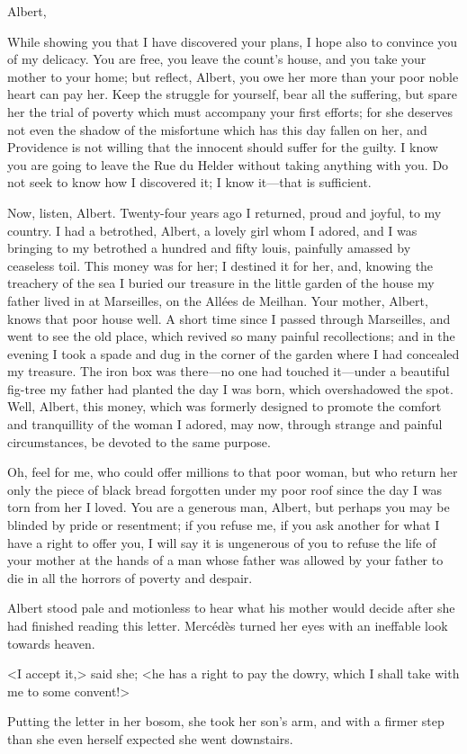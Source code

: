 \begin{mail}{}{Albert,}
	
While showing you that I have discovered your plans, I hope also to convince you of my delicacy. You are free, you leave the count's house, and you take your mother to your home; but reflect, Albert, you owe her more than your poor noble heart can pay her. Keep the struggle for yourself, bear all the suffering, but spare her the trial of poverty which must accompany your first efforts; for she deserves not even the shadow of the misfortune which has this day fallen on her, and Providence is not willing that the innocent should suffer for the guilty. I know you are going to leave the Rue du Helder without taking anything with you. Do not seek to know how I discovered it; I know it—that is sufficient. 

Now, listen, Albert. Twenty-four years ago I returned, proud and joyful, to my country. I had a betrothed, Albert, a lovely girl whom I adored, and I was bringing to my betrothed a hundred and fifty louis, painfully amassed by ceaseless toil. This money was for her; I destined it for her, and, knowing the treachery of the sea I buried our treasure in the little garden of the house my father lived in at Marseilles, on the Allées de Meilhan. Your mother, Albert, knows that poor house well. A short time since I passed through Marseilles, and went to see the old place, which revived so many painful recollections; and in the evening I took a spade and dug in the corner of the garden where I had concealed my treasure. The iron box was there—no one had touched it—under a beautiful fig-tree my father had planted the day I was born, which overshadowed the spot. Well, Albert, this money, which was formerly designed to promote the comfort and tranquillity of the woman I adored, may now, through strange and painful circumstances, be devoted to the same purpose. 

 Oh, feel for me, who could offer millions to that poor woman, but who return her only the piece of black bread forgotten under my poor roof since the day I was torn from her I loved. You are a generous man, Albert, but perhaps you may be blinded by pride or resentment; if you refuse me, if you ask another for what I have a right to offer you, I will say it is ungenerous of you to refuse the life of your mother at the hands of a man whose father was allowed by your father to die in all the horrors of poverty and despair.
 \end{mail}

 Albert stood pale and motionless to hear what his mother would decide after she had finished reading this letter. Mercédès turned her eyes with an ineffable look towards heaven. 

 <I accept it,> said she; <he has a right to pay the dowry, which I shall take with me to some convent!> 

 Putting the letter in her bosom, she took her son's arm, and with a firmer step than she even herself expected she went downstairs. 